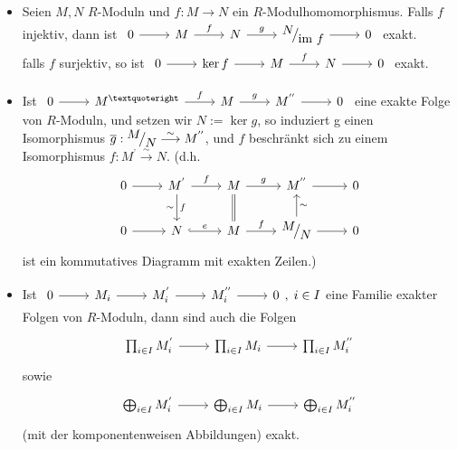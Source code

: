 \begin{anm}
	\begin{itemize}
		\item Seien $M,N$ $R$-Moduln und $ f:M \to N $ ein $R$-Modulhomomorphismus. Falls $f$ injektiv, dann ist $\begin{tikzcd}
		0  \arrow{r} & M \arrow{r}{f} & N \arrow{r}{g} & \QR{N}{\im f} \arrow{r} & 0
		\end{tikzcd} $ exakt. \\
		falls $f$ surjektiv, so ist $\begin{tikzcd}
		0  \arrow{r} & \ker f \arrow{r} & M \arrow{r}{f} & N \arrow{r} & 0
		\end{tikzcd} $ exakt.
		\item Ist $\begin{tikzcd}
		0  \arrow{r} & M^{’} \arrow{r}{f} & M \arrow{r}{g} & M^{''} \arrow{r} & 0
		\end{tikzcd} $ eine exakte Folge von $R$-Moduln, und setzen wir $N:= \ker g$, so induziert g einen Isomorphismus $\overline{g}: \QR{M}{N} \overset{\sim}{\longrightarrow}  M^{''}$, und $f$ beschränkt sich zu einem Isomorphismus $f: M^{’} \overset{\sim}{\longrightarrow} N$. 
		(d.h. $$\begin{tikzcd}
		0 \arrow{r}& M^{'} \arrow{r}{f}\arrow{d}[swap]{\sim}{f}& M \arrow{r}{g} \arrow[equal]{d} & M^{''} \arrow[swap]{r} & 0\\
		0 \arrow{r}& N \arrow[hook]{r}{e}& M \arrow{r}{f} & \arrow{u}[swap]{\sim}\QR{M}{N} \arrow{r} & 0
		\end{tikzcd}$$
		ist ein kommutatives Diagramm mit exakten Zeilen.)
		\item Ist $\begin{tikzcd}
		0  \arrow{r} & M_i \arrow{r} & M_i^{'} \arrow{r} & M_i^{''} \arrow{r} & 0
		\end{tikzcd}, \; i \in I$ eine Familie exakter Folgen von $R$-Moduln, dann sind auch die Folgen 
		$$ \begin{tikzcd}
		\prod_{i\in I} M_i^{'} \arrow{r}& \prod_{i\in I} M_i \arrow{r}& \prod_{i\in I} M_i^{''}
		\end{tikzcd}$$ 
		sowie
		$$\begin{tikzcd}
		\bigoplus_{i\in I} M_i^{'} \arrow{r} &\bigoplus_{i\in I} M_i \arrow{r}& \bigoplus_{i\in I} M_i^{''}
		\end{tikzcd}$$
		(mit der komponentenweisen Abbildungen) exakt.\\
	\end{itemize}
\end{anm}
